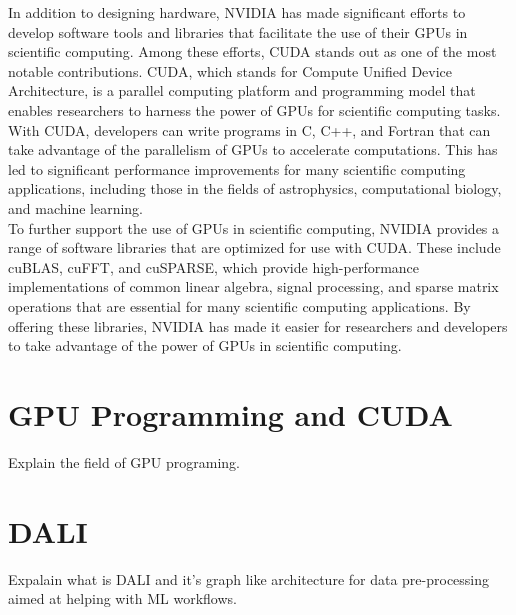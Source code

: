 \documentclass[licencjacka,en]{pracamgr}
\begin{document}
In addition to designing hardware, NVIDIA has made significant efforts to develop software tools and libraries that facilitate the use of their GPUs in scientific computing. Among these efforts, CUDA stands out as one of the most notable contributions. CUDA, which stands for Compute Unified Device Architecture, is a parallel computing platform and programming model that enables researchers to harness the power of GPUs for scientific computing tasks. With CUDA, developers can write programs in C, C++, and Fortran that can take advantage of the parallelism of GPUs to accelerate computations. This has led to significant performance improvements for many scientific computing applications, including those in the fields of astrophysics, computational biology, and machine learning. \\

To further support the use of GPUs in scientific computing, NVIDIA provides a range of software libraries that are optimized for use with CUDA. These include cuBLAS, cuFFT, and cuSPARSE, which provide high-performance implementations of common linear algebra, signal processing, and sparse matrix operations that are essential for many scientific computing applications. By offering these libraries, NVIDIA has made it easier for researchers and developers to take advantage of the power of GPUs in scientific computing. \\



\section{GPU Programming and CUDA}
Explain the field of GPU programing.

\section{DALI}
Expalain what is DALI and it's graph like architecture for data pre-processing aimed at helping with ML workflows. \\
\end{document}
